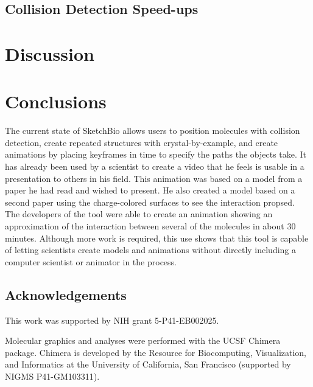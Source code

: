 \documentclass[twocolumn]{bmcart}%
\begin{document}

\subsection*{Collision Detection Speed-ups}

\section*{Discussion}

\section*{Conclusions} %
The current state of SketchBio allows users to position molecules with collision detection, create repeated structures with crystal-by-example, and create animations by placing keyframes in time to specify the paths the objects take.  It has already been used by a scientist to create a video that he feels is usable in a presentation to others in his field.  This animation was based on a model from a paper he had read and wished to present.  He also created a model based on a second paper using the charge-colored surfaces to see the interaction propsed.  The developers of the tool were able to create an animation showing an approximation of the interaction between several of the molecules in about 30 minutes.  Although more work is required, this use shows that this tool is capable of letting scientists create models and animations without directly including a computer scientist or animator in the process.

\subsection*{Acknowledgements}
This work was supported by NIH grant 5-P41-EB002025.

Molecular graphics and analyses were performed with the UCSF Chimera package. Chimera is developed by the Resource for Biocomputing, Visualization, and Informatics at the University of California, San Francisco (supported by NIGMS P41-GM103311).

\end{document}

